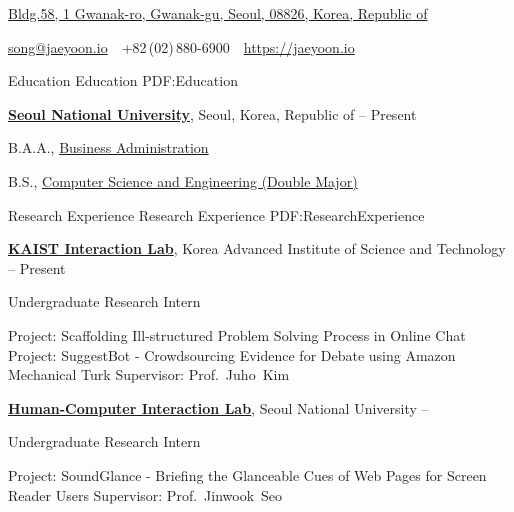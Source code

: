 \documentclass[letterpaper,MMMyyyy,nonstopmode]{simpleresumecv}
\newcommand{\CVAuthor}{Jaeyoon Song}
\newcommand{\CVWebpage}{https://jaeyoon.io}
\begin{document}

\Title{\CVAuthor}

\begin{SubTitle}
\href{https://www.google.com/maps/place/1+Gwanak-ro,+Daehak-dong,+Gwanak-gu,+Seoul,+South+Korea}
{Bldg.58, 1 Gwanak-ro, Gwanak-gu, Seoul, 08826, Korea, Republic of}
\par
\href{mailto:song@jaeyoon.io}
{song@jaeyoon.io}
\,\SubBulletSymbol\,
+82\,(02)\,880-6900
\,\SubBulletSymbol\,
\href{\CVWebpage}
{\url{\CVWebpage}}
\end{SubTitle}

\begin{Body}



\BigGap
\Section
{Education}
{Education}
{PDF:Education}

\Entry
\href{http://www.snu.ac.kr}
{\textbf{Seoul National University}},
Seoul, Korea, Republic of
\hfill
{} --
Present

\Gap
\BulletItem
B.A.A.,
\href{http://cba.snu.ac.kr}
{Business Administration}

\Gap
\BulletItem
B.S.,
\href{http://cse.snu.ac.kr}
{Computer Science and Engineering (Double Major)}

\BigGap
\Section
{Research Experience}
{Research Experience}
{PDF:ResearchExperience}

\Entry
\href{https://www.kixlab.org}
{\textbf{KAIST Interaction Lab}},
Korea Advanced Institute of Science and Technology
\hfill
{} --
Present

\Gap
\BulletItem
Undergraduate Research Intern
\begin{Detail}
\SubBulletItem
Project:
Scaffolding Ill-structured Problem Solving Process in Online Chat
\SubBulletItem
Project:
SuggestBot - Crowdsourcing Evidence for Debate using Amazon Mechanical Turk
\SubBulletItem
Supervisor:
Prof.~Juho~Kim
\end{Detail}

\BigGap
\Entry
\href{http://hcil.snu.ac.kr/}
{\textbf{Human-Computer Interaction Lab}},
Seoul National University
\hfill
{} --

\Gap
\BulletItem
Undergraduate Research Intern
\begin{Detail}
\SubBulletItem
Project:
SoundGlance - Briefing the Glanceable Cues of Web Pages for Screen Reader Users
\SubBulletItem
Supervisor:
Prof.~Jinwook~Seo
\end{Detail}


\end{Body}
\end{document}
